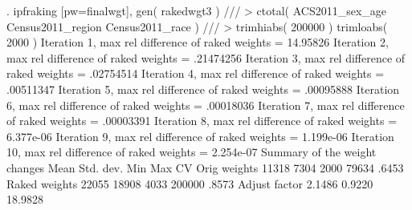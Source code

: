 . ipfraking [pw=finalwgt], gen( rakedwgt3 ) ///
>     ctotal( ACS2011_sex_age Census2011_region Census2011_race ) ///
>     trimhiabs( 200000 ) trimloabs( 2000 )
{\smallskip}
 Iteration 1, max rel difference of raked weights = 14.95826
 Iteration 2, max rel difference of raked weights = .21474256
 Iteration 3, max rel difference of raked weights = .02754514
 Iteration 4, max rel difference of raked weights = .00511347
 Iteration 5, max rel difference of raked weights = .00095888
 Iteration 6, max rel difference of raked weights = .00018036
 Iteration 7, max rel difference of raked weights = .00003391
 Iteration 8, max rel difference of raked weights = 6.377e-06
 Iteration 9, max rel difference of raked weights = 1.199e-06
 Iteration 10, max rel difference of raked weights = 2.254e-07
{\smallskip}
   Summary of the weight changes
{\smallskip}
              {\VBAR}    Mean    Std. dev.    Min        Max       CV
Orig weights  {\VBAR}    11318       7304      2000       79634   .6453
Raked weights {\VBAR}    22055      18908      4033      200000   .8573
Adjust factor {\VBAR}   2.1486               0.9220     18.9828
{\smallskip}
